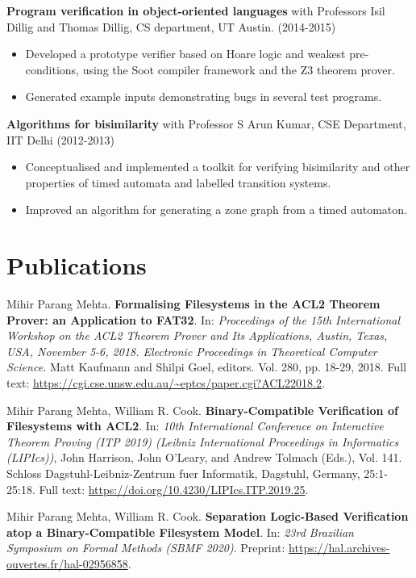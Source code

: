 \documentclass[margin]{res}
\begin{document}
\begin{resume}
 {\bf Program verification in object-oriented languages} with Professors Isil Dillig and Thomas
 Dillig, CS department, UT Austin. \hfill (2014-2015)
 \begin{itemize} \itemsep -2pt  %
 \item Developed a prototype verifier based on Hoare logic and weakest
   pre-conditions, using the Soot compiler framework and the Z3 theorem prover.
 \item Generated example
   inputs demonstrating bugs in several test programs.
 \end{itemize}

 {\bf Algorithms for bisimilarity} with Professor S
 Arun Kumar, CSE Department, IIT Delhi    \hfill
 (2012-2013)
 \begin{itemize} \itemsep -2pt
 \item Conceptualised and implemented a toolkit for
   verifying bisimilarity and other properties of timed automata
   and labelled transition systems.
 \item Improved an algorithm for generating a zone
   graph from a timed automaton.

 \end{itemize}

\section{Publications}
  Mihir Parang Mehta. {\bf Formalising Filesystems in the ACL2 Theorem
    Prover: an Application to FAT32}. In: \textit{Proceedings of the
    15th International Workshop on the ACL2 Theorem Prover and Its
    Applications, Austin, Texas, USA, November 5-6, 2018. Electronic
    Proceedings in Theoretical Computer Science.}  Matt Kaufmann and
  Shilpi Goel, editors.  Vol.  280, pp. 18-29, 2018. Full text:
  \url{https://cgi.cse.unsw.edu.au/~eptcs/paper.cgi?ACL22018.2}.

  Mihir Parang Mehta, William R. Cook. {\bf Binary-Compatible
    Verification of Filesystems with ACL2}. In: \textit{10th
    International Conference on Interactive Theorem Proving (ITP 2019)
    (Leibniz International Proceedings in Informatics (LIPIcs))}, John
  Harrison, John O'Leary, and Andrew Tolmach (Eds.), Vol. 141. Schloss
  Dagstuhl-Leibniz-Zentrum fuer Informatik, Dagstuhl, Germany,
  25:1-25:18. Full text:
  \url{https://doi.org/10.4230/LIPIcs.ITP.2019.25}.

  Mihir Parang Mehta, William R. Cook. {\bf Separation Logic-Based
    Verification atop a Binary-Compatible Filesystem Model}. In:
  \textit{23rd Brazilian Symposium on Formal Methods (SBMF 2020)}. Preprint:
  \url{https://hal.archives-ouvertes.fr/hal-02956858}.


\end{resume}
\end{document}
